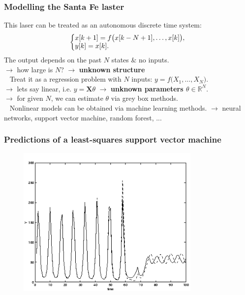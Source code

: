 \begin{frame}
	\frametitle{Modelling the Santa Fe laster}
	This laser can be treated as an autonomous discrete time system:
	\begin{align*}
	\left\{ \begin{matrix} 
	x[k+1] = f\big(x[k-N+1], \ldots, x[k]\big), \\
	y[k] = x[k]. \hfill
	\end{matrix}\right.
	\end{align*}
	The output depends on the past $N$ states $\&$ no inputs.\\
	\pause
	$\rightarrow$ how large is $N$? $\rightarrow$ \textbf{unknown structure} \\
	\ \newline
	\pause
	Treat it as a regression problem with $N$ inputs: $y = f\big(X_1,\ldots,X_N\big)$. \\
	\pause
	$\rightarrow$ lets say linear, i.e. $y = \mathbf{X}\theta$ $\rightarrow$ \textbf{unknown parameters $\theta \in \mathbb{R}^N$}. \\
	\pause
	$\rightarrow$ for given $N$, we can estimate $\theta$ via grey box methods.\\
	\ \newline
	\pause
	Nonlinear models can be obtained via machine learning methods.
	$\rightarrow$ neural networks, support vector machine, random forest, ...
\end{frame}

\begin{frame}
	\frametitle{Predictions of a least-squares support vector machine}
	\begin{figure}[!h]
		\centering
		\includegraphics[width=0.8\textwidth]{img/santafe-prediction.png}
	\end{figure}
\end{frame}


